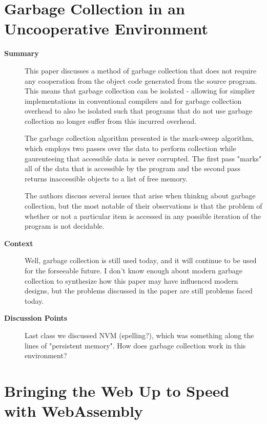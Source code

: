 \section {Garbage Collection in an Uncooperative Environment
\cite{boehm1988garbage}}

\begin{description}
    \item[\textbf{Summary}]
    This paper discusses a method of garbage collection that does not require
    any cooperation from the object code generated from the source program.
    This means that garbage collection can be isolated - allowing for simplier
    implementations in conventional compilers and for garbage collection
    overhead to also be isolated such that programs that do not use garbage
    collection no longer suffer from this incurred overhead.
    
    The garbage collection algorithm presented is the mark-sweep algorithm,
    which employs two passes over the data to perform collection while
    gaurenteeing that accessible data is never corrupted. The first pass "marks"
    all of the data that is accessible by the program and the second pass
    returns inaccessible objects to a list of free memory.

    The authors discuss several issues that arise when thinkng about garbage
    collection, but the most notable of their observations is that the
    problem of whether or not a particular item is accessed in any possible
    iteration of the program is not decidable. 
    \item[\textbf{Context}]
    Well, garbage collection is still used today, and it will continue to be
    used for the forseeable future. I don't know enough about modern garbage
    collection to synthesize how this paper may have influenced modern designs,
    but the problems discussed in the paper are still problems faced today.
    \item[\textbf{Discussion Points}]
    Last class we discussed NVM (spelling?), which was something along the
    lines of "persistent memory". How does garbage collection work in this
    environment?
\end{description}

\section {Bringing the Web Up to Speed with WebAssembly \cite{haas2017bringing}}

